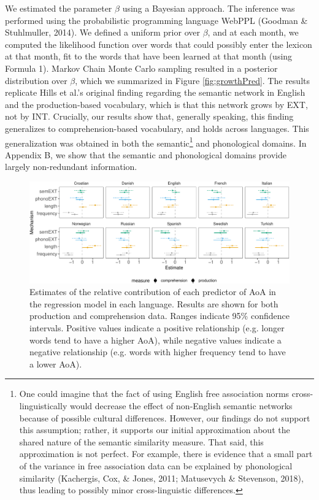 \documentclass[english,,man,floatsintext]{apa6}
\let\rmarkdownfootnote\footnote%
\def\footnote{\protect\rmarkdownfootnote}
\begin{document}
We estimated the parameter \(\beta\) using a Bayesian approach. The inference was performed using the probabilistic programming language WebPPL (Goodman \& Stuhlmuller, 2014). We defined a uniform prior over \(\beta\), and at each month, we computed the likelihood function over words that could possibly enter the lexicon at that month, fit to the words that have been learned at that month (using Formula 1). Markov Chain Monte Carlo sampling resulted in a posterior distribution over \(\beta\), which we summarized in Figure \ref{fig:growthPred}. The results replicate Hills et al.'s original finding regarding the semantic network in English and the production-based vocabulary, which is that this network grows by EXT, not by INT. Crucially, our results show that, generally speaking, this finding generalizes to comprehension-based vocabulary, and holds across languages. This generalization was obtained in both the semantic\footnote{One could imagine that the fact of using English free association norms cross-linguistically would decrease the effect of non-English semantic networks because of possible cultural differences. However, our findings do not support this assumption; rather, it supports our initial approximation about the shared nature of the semantic similarity measure. That said, this approximation is not perfect. For example, there is evidence that a small part of the variance in free association data can be explained by phonological similarity (Kachergis, Cox, \& Jones, 2011; Matusevych \& Stevenson, 2018), thus leading to possibly minor cross-linguistic differences.} and phonological domains. In Appendix B, we show that the semantic and phonological domains provide largely non-redundant information.

\begin{figure}[!h]
\includegraphics[width=\textwidth]{ms_files/figure-latex/staticPred-1} \caption{Estimates of the relative contribution of each predictor of AoA in the regression model in each language. Results are shown for both production and comprehension data. Ranges indicate 95\% confidence intervals. Positive values indicate a positive relationship (e.g. longer words tend to have a higher AoA), while negative values indicate a negative relationship (e.g. words with higher frequency tend to have a lower AoA).}\label{fig:staticPred}
\end{figure}
\end{document}

